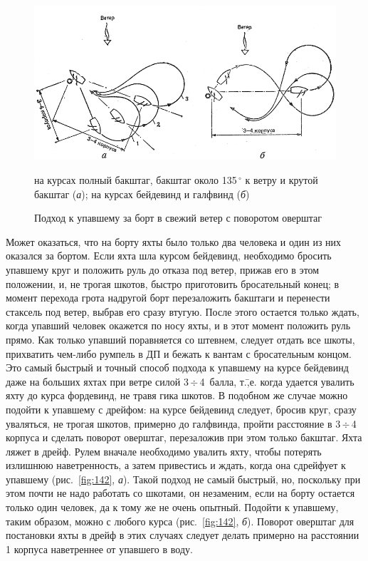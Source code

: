 \documentclass[a4paper, 12pt, twoside, final, book, russian, fittopage, cyremdash]{ncc}
\newcommand{\gr}{\ensuremath{\,^\circ}\xspace}
\newcommand{\otdo}{\,\ensuremath{\div}\,}
\newcommand{\ris}[1]{\ref{fig:#1}}
\begin{document}
\begin{figure}[htb]
  \centering{}
  \includegraphics[scale=1.3]{0139P}
  \caption{Подход к упавшему за борт в свежий ветер с поворотом оверштаг}
  \label{fig:139}
  \small
  \centering{}
  на курсах полный бакштаг, бакштаг около 135\gr к ветру и крутой бакштаг (\textit{а}); на курсах бейдевинд и галфвинд (\textit{б})
\end{figure}

Может оказаться, что на борту яхты было только два человека и один из них оказался за бортом. Если яхта шла курсом бейдевинд, необходимо бросить упавшему круг и положить руль до отказа под ветер, прижав его в этом положении, и, не трогая шкотов, быстро приготовить бросательный конец; в момент перехода грота надругой борт перезаложить бакштаги и перенести стаксель под ветер, выбрав его сразу втугую. После этого остается только ждать, когда упавший человек окажется по носу яхты, и в этот момент положить руль прямо. Как только упавший поравняется со штевнем, следует отдать все шкоты, прихватить чем-либо румпель в ДП и бежать к вантам с бросательным концом. Это самый быстрый и точный способ подхода к упавшему на курсе бейдевинд даже на больших яхтах при ветре силой 3\otdo 4~балла, т.\=,е. когда удается увалить яхту до курса фордевинд, не травя гика шкотов. В подобном же случае можно подойти к упавшему с дрейфом: на курсе бейдевинд следует, бросив круг, сразу уваляться, не трогая шкотов, примерно до галфвинда, пройти расстояние в 3\otdo 4 корпуса и сделать поворот оверштаг, перезаложив при этом только бакштаг. Яхта ляжет в дрейф. Рулем вначале необходимо увалить яхту, чтобы потерять излишнюю наветренность, а затем привестись и ждать, когда она сдрейфует к упавшему (рис.~\ris{142}, \textit{а}). Такой подход не самый быстрый, но, поскольку при этом почти не надо работать со шкотами, он незаменим, если на борту остается только один человек, да к тому же не очень опытный. Подойти к упавшему, таким образом, можно с любого курса (рис.~\ris{142}, \textit{б}). Поворот оверштаг для постановки яхты в дрейф в этих случаях следует делать примерно на расстоянии 1 корпуса наветреннее от упавшего в воду. 
\end{document}
